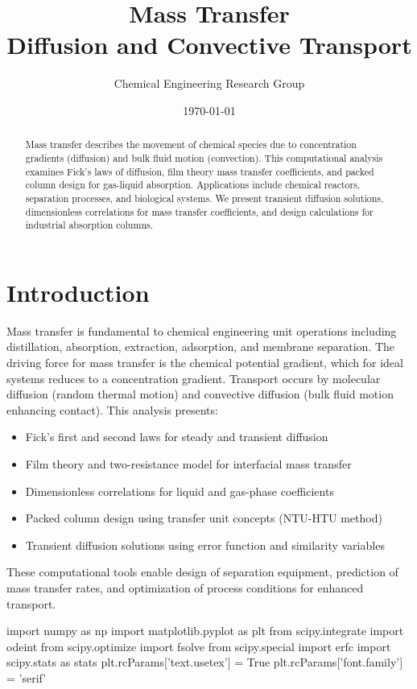 \documentclass[11pt,a4paper]{article}
\title{Mass Transfer\\Diffusion and Convective Transport}
\author{Chemical Engineering Research Group}
\date{\today}
\begin{document}
\maketitle

\begin{abstract}
Mass transfer describes the movement of chemical species due to concentration gradients (diffusion) and bulk fluid motion (convection). This computational analysis examines Fick's laws of diffusion, film theory mass transfer coefficients, and packed column design for gas-liquid absorption. Applications include chemical reactors, separation processes, and biological systems. We present transient diffusion solutions, dimensionless correlations for mass transfer coefficients, and design calculations for industrial absorption columns.
\end{abstract}

\section{Introduction}

Mass transfer is fundamental to chemical engineering unit operations including distillation, absorption, extraction, adsorption, and membrane separation. The driving force for mass transfer is the chemical potential gradient, which for ideal systems reduces to a concentration gradient. Transport occurs by molecular diffusion (random thermal motion) and convective diffusion (bulk fluid motion enhancing contact). This analysis presents:

\begin{itemize}
    \item Fick's first and second laws for steady and transient diffusion
    \item Film theory and two-resistance model for interfacial mass transfer
    \item Dimensionless correlations for liquid and gas-phase coefficients
    \item Packed column design using transfer unit concepts (NTU-HTU method)
    \item Transient diffusion solutions using error function and similarity variables
\end{itemize}

These computational tools enable design of separation equipment, prediction of mass transfer rates, and optimization of process conditions for enhanced transport.

\begin{pycode}

import numpy as np
import matplotlib.pyplot as plt
from scipy.integrate import odeint
from scipy.optimize import fsolve
from scipy.special import erfc
import scipy.stats as stats
plt.rcParams['text.usetex'] = True
plt.rcParams['font.family'] = 'serif'

\end{pycode}
\end{document}
